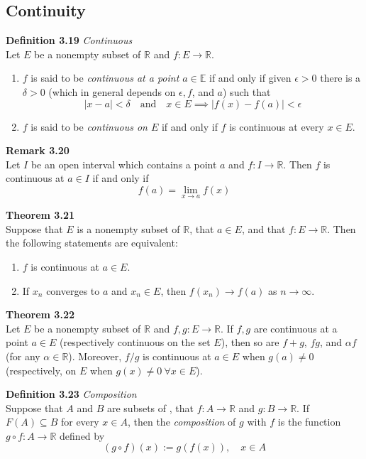 \documentclass[8pt,landscape]{article}
\begin{document}
\begin{multicols}{3}
    \subsection{Continuity}

    \textbf{Definition 3.19} \emph{Continuous} \\
    Let $E$ be a nonempty subset of $\mathbb{R}$ and $f : E \to \mathbb{R}$.
    \begin{enumerate}
        \item $f$ is said to be \emph{continuous at a point $a \in \mathbb{E}$} if and only
            if given $\epsilon > 0$ there is a $\delta > 0$
            (which in general depends on $\epsilon, f$, and $a$) such that
            \[
                |x-a| < \delta \quad \text{and} \quad x \in E \implies
                |f(x) - f(a)| < \epsilon
            \]
        \item $f$ is said to be \emph{continuous on $E$} if and only if $f$ is continuous
            at every $x \in E$.
    \end{enumerate}

    \textbf{Remark 3.20} \\
    Let $I$ be an open interval which contains a point $a$ and $f : I \to \mathbb{R}$.
    Then $f$ is continuous at $a \in I$ if and only if
    \[
        f(a) = \lim_{x \to a} f(x)
    \]

    \textbf{Theorem 3.21} \\
    Suppose that $E$ is a nonempty subset of $\mathbb{R}$, that $a \in E$, and that
    $f : E \to \mathbb{R}$.
    Then the following statements are equivalent:
    \begin{enumerate}
        \item $f$ is continuous at $a \in E$.
        \item If $x_n$ converges to $a$ and $x_n \in E$, then
            $f(x_n) \to f(a)$ as $n \to \infty$.
    \end{enumerate}

    \textbf{Theorem 3.22} \\
    Let $E$ be a nonempty subset of $\mathbb{R}$ and $f, g : E \to \mathbb{R}$.
    If $f, g$ are continuous at a point $a \in E$ (respectively continuous on the set $E$),
    then so are $f+g$, $fg$, and $\alpha f$ (for any $\alpha \in \mathbb{R}$).
    Moreover, $f/g$ is continuous at $a \in E$ when $g(a) \neq 0$
    (respectively, on $E$ when $g(x) \neq 0\ \forall x \in E$).

    \textbf{Definition 3.23} \emph{Composition} \\
    Suppose that $A$ and $B$ are subsets of , that $f : A \to \mathbb{R}$
    and $g : B \to \mathbb{R}$.
    If $F(A) \subseteq B$ for every $x \in A$, then the \emph{composition} of $g$ with $f$
    is the function $g \circ f : A \to \mathbb{R}$ defined by
    \[
        (g \circ f) (x) := g(f(x)), \quad x \in A
    \]


\end{multicols}
\end{document}
